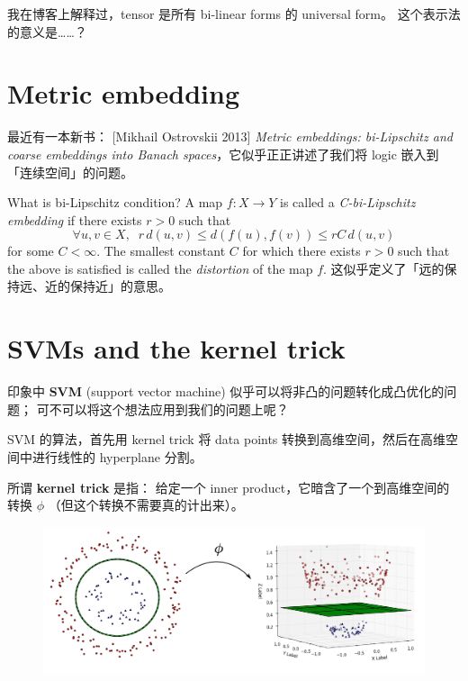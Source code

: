 \documentclass[12pt]{article}
\begin{document}
我在博客上解释过，tensor 是所有 bi-linear forms 的 universal form。 这个表示法的意义是……？

\section{Metric embedding}

最近有一本新书： [Mikhail Ostrovskii 2013] \textit{Metric embeddings: bi-Lipschitz and coarse embeddings into Banach spaces}，它似乎正正讲述了我们将 logic 嵌入到「连续空间」的问题。

What is bi-Lipschitz condition?  A map $f: X \rightarrow Y$ is called a \textit{C-bi-Lipschitz embedding} if there exists $r > 0$ such that
$$ \forall u,v \in X, \;\; r\, d(u,v) \leq d(f(u), f(v)) \leq r C\, d(u,v) $$
for some $C < \infty$.  The smallest constant $C$ for which there exists $r > 0$ such that the above is satisfied is called the \textit{distortion} of the map $f$.  这似乎定义了「远的保持远、近的保持近」的意思。

\section{SVMs and the kernel trick}

印象中 \textbf{SVM} (support vector machine) 似乎可以将非凸的问题转化成凸优化的问题； 可不可以将这个想法应用到我们的问题上呢？

SVM 的算法，首先用 kernel trick 将 data points 转换到高维空间，然后在高维空间中进行线性的 hyperplane 分割。

所谓 \textbf{kernel trick} 是指： 给定一个 inner product，它暗含了一个到高维空间的转换 $\phi$ （但这个转换不需要真的计出来）。


\begin{figure}[H]
\centering
\includegraphics[scale=0.6]{kernel-trick.png}
\end{figure}
\end{document}
